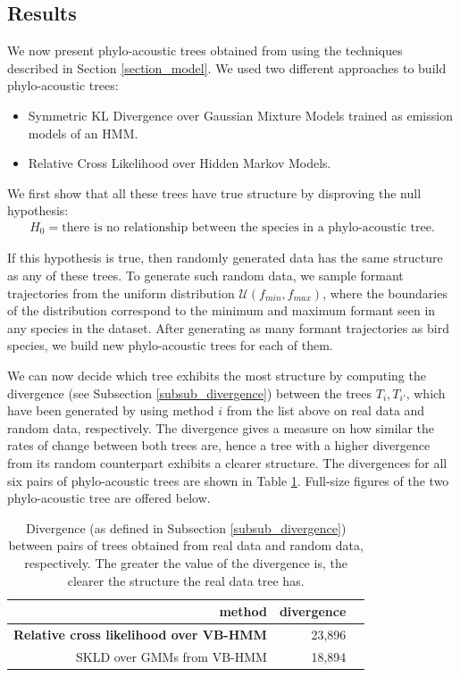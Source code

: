 \documentclass[pdftex,11pt,a4paper]{article}
\theoremstyle{definition}
\theoremstyle{remark}
\begin{document}
\subsection{Results}
\label{sub_results}
We now present phylo-acoustic trees obtained from using the techniques described in Section \ref{section_model}. We used two different approaches to build phylo-acoustic trees:
\begin{itemize}
\item Symmetric KL Divergence over Gaussian Mixture Models trained as emission models of an HMM.
\item Relative Cross Likelihood over Hidden Markov Models.
\end{itemize}
\par We first show that all these trees have true structure by disproving the null hypothesis:
\begin{align*}
H_0 = \text{there is no relationship between the species in a phylo-acoustic tree.}
\end{align*}
\par If this hypothesis is true, then randomly generated data has the same structure as any of these trees. To generate such random data, we sample formant trajectories from the uniform distribution $\mathcal{U}(f_{min}, f_{max})$, where the boundaries of the distribution correspond to the minimum and maximum formant seen in any species in the dataset. After generating as many formant trajectories as bird species, we build new phylo-acoustic trees for each of them.
\par We can now decide which tree exhibits the most structure by computing the divergence (see Subsection \ref{subsub_divergence}) between the trees $T_i, T_{i'}$, which have been generated by using method $i$ from the list above on real data and random data, respectively. The divergence gives a measure on how similar the rates of change between both trees are, hence a tree with a higher divergence from its random counterpart exhibits a clearer structure. The divergences for all six pairs of phylo-acoustic trees are shown in Table \ref{tab1}. Full-size figures of the two phylo-acoustic tree are offered below. 

\begin{table}[t]
\begin{tabular}{r|r|r}
     \textbf{method} &\textbf{divergence}\\
     \hline
     \textbf{Relative cross likelihood over VB-HMM} & 23,896\\
     SKLD over GMMs from VB-HMM & 18,894
\end{tabular} 
\caption{Divergence (as defined in Subsection \ref{subsub_divergence}) between pairs of trees obtained from real data and random data, respectively. The greater the value of the divergence is, the clearer the structure the real data tree has.} \label{tab1}
\end{table}
\end{document}
